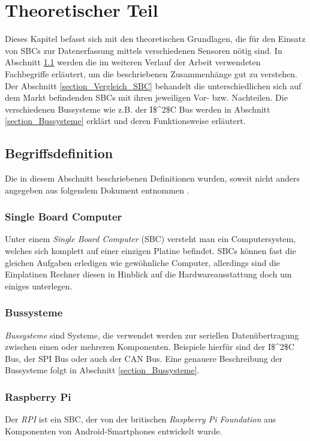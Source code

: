 \chapter{Theoretischer Teil}
\label{chapter_TheoretischerTeil}
Dieses Kapitel befasst sich mit den theoretischen Grundlagen, die für den Einsatz von \acp{SBC} zur Datenerfassung mittels verschiedenen Sensoren nötig sind. In Abschnitt \ref{section_Begriffsdefiniton} werden die im weiteren Verlauf der Arbeit verwendeten Fachbegriffe erläutert, um die beschriebenen Zusammenhänge gut zu verstehen. Der Abschnitt \ref{section_Vergleich_SBC} behandelt die unterschiedlichen sich auf dem Markt befindenden \acp{SBC} mit ihren jeweiligen Vor- bzw. Nachteilen. Die verschiedenen Bussysteme wie z.B. der \ac{I$^2$C}  Bus werden in Abschnitt \ref{section_Bussysteme} erklärt und deren Funktionsweise erläutert. 


\section{Begriffsdefinition}
\label{section_Begriffsdefiniton}
Die in diesem Abschnitt beschriebenen Definitionen wurden, soweit nicht anders angegeben aus folgendem Dokument entnommen \citep{Bussysteme_in_der_Praxis}.

\subsection*{Single Board Computer}
Unter einem \textit{Single Board Computer} (\ac{SBC}) versteht man ein Computersystem, welches sich komplett auf einer einzigen Platine befindet. \acp{SBC} können fast die gleichen Aufgaben erledigen wie gewöhnliche Computer, allerdings sind die Einplatinen Rechner diesen in Hinblick auf die Hardwareausstattung doch um einiges unterlegen.

\subsection*{Bussysteme}
\textit{Bussysteme} sind Systeme, die verwendet werden zur seriellen Datenübertragung zwischen einen oder mehreren Komponenten. Beispiele hierfür sind der \ac{I$^2$C} Bus, der \ac{SPI} Bus oder auch der \ac{CAN} Bus. Eine genauere Beschreibung der Bussysteme folgt in Abschnitt \ref{section_Bussysteme}.

\subsection*{Raspberry Pi}
Der \textit{\ac{RPI}} ist ein \ac{SBC}, der von der britischen \textit{Raspberry Pi Foundation} aus Komponenten von Android-Smartphones entwickelt wurde.

